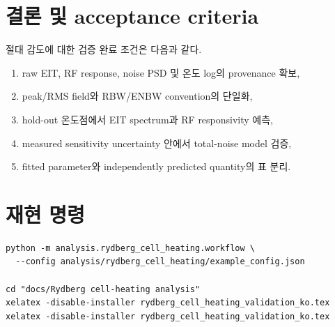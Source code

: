 \documentclass[11pt,a4paper]{article}
\begin{document}
\section{결론 및 acceptance criteria}

절대 감도에 대한 검증 완료 조건은 다음과 같다.

\begin{enumerate}
  \item raw EIT, RF response, noise PSD 및 온도 log의 provenance 확보,
  \item peak/RMS field와 RBW/ENBW convention의 단일화,
  \item hold-out 온도점에서 EIT spectrum과 RF responsivity 예측,
  \item measured sensitivity uncertainty 안에서 total-noise model 검증,
  \item fitted parameter와 independently predicted quantity의 표 분리.
\end{enumerate}

\appendix
\section{재현 명령}

\begin{verbatim}
python -m analysis.rydberg_cell_heating.workflow \
  --config analysis/rydberg_cell_heating/example_config.json

cd "docs/Rydberg cell-heating analysis"
xelatex -disable-installer rydberg_cell_heating_validation_ko.tex
xelatex -disable-installer rydberg_cell_heating_validation_ko.tex
\end{verbatim}
\end{document}
